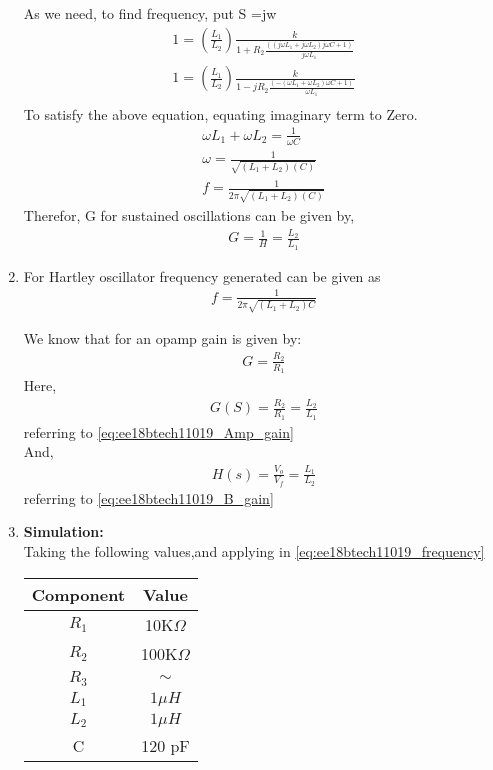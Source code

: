 \begin{enumerate}[label=\thesection.\arabic*.,ref=\thesection.\theenumi]
As we need, to find frequency, put S =jw
\begin{align}
   1 = (\frac{L_1}{L_2})\frac{k}{1 + R_2\frac{((j\omega L_1 + j\omega L_2)j\omega C + 1)}{j\omega L_1}}\\
   1 = (\frac{L_1}{L_2})\frac{k}{1 -j R_2\frac{(-(\omega L_1 + \omega L_2)\omega C + 1)}{\omega L_1}}\\
\end{align}
To satisfy the above equation, equating imaginary term to Zero.
\begin{align}    
    \omega L_1 + \omega L_2  = \frac{1}{\omega C}\\
    \omega = \frac{1}{\sqrt{(L_1+L_2)(C)}}\\
    f = \frac{1}{2\pi \sqrt{(L_1+L_2)(C)}}
\end{align}
Therefor, G for sustained oscillations can be given by,\\
\begin{align}
    G = \frac{1}{H}
     =  \frac{L_2}{L_1} 
\label{eq:ee18btech11019_Amp_gain}
\end{align}
 
\item For Hartley oscillator frequency generated can be given as 
\begin{align}
    f = \frac{1}{2\pi\sqrt{(L_1 + L_2)C}}
    \label{eq:ee18btech11019_frequency}
\end{align}

We know that for an opamp gain is given by:
\begin{align}
    G = \frac{R_2}{R_1}
\end{align}
Here,
\begin{align}
    G(S) = \frac{R_2}{R_1} = \frac{L_2}{L_1}
\end{align}
referring to \ref{eq:ee18btech11019_Amp_gain}\\
And,
\begin{align}
    H(s) = \frac{V_o}{V_f} = \frac{L_1}{L_2}
\end{align}
referring to \ref{eq:ee18btech11019_B_gain}\\
\newline
\item \textbf{Simulation:}\\
Taking the following values,and applying in \ref{eq:ee18btech11019_frequency} \\



\begin{tabular}{|c|c|}
\hline
Component & Value  \\
\hline
$R_1$         & 10K$\Omega$   \\
\hline
$R_2$         & 100K$\Omega$   \\
\hline
$R_3$         & $\sim$  \\
\hline
$L_1$         & $1 \mu H$     \\
\hline
$L_2$         & $1 \mu H$   \\
\hline
C         & 120 pF \\
\hline
\end{tabular}
\\


\end{enumerate}
